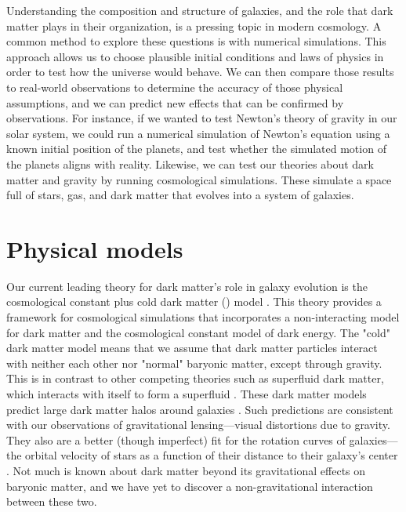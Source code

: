 
Understanding the composition and structure of galaxies, and the role that dark matter plays in their organization, is a pressing topic in modern cosmology. A common method to explore these questions is with numerical simulations. This approach allows us to choose plausible initial conditions and laws of physics in order to test how the universe would behave. We can then compare those results to real-world observations to determine the accuracy of those physical assumptions, and we can predict new effects that can be confirmed by observations. For instance, if we wanted to test Newton's theory of gravity in our solar system, we could run a numerical simulation of Newton's equation using a known initial position of the planets, and test whether the simulated motion of the planets aligns with reality. Likewise, we can test our theories about dark matter and gravity by running cosmological simulations. These simulate a space full of stars, gas, and dark matter that evolves into a system of galaxies.

\section{Physical models}

Our current leading theory for dark matter's role in galaxy evolution is the cosmological constant plus cold dark matter (\lcdm) model \citep{whiteCoreCondensationHeavy1978}. This theory provides a framework for cosmological simulations that incorporates a non-interacting model for dark matter and the cosmological constant model of dark energy. The "cold" dark matter model means that we assume that dark matter particles interact with neither each other nor "normal" baryonic matter, except through gravity. This is in contrast to other competing theories such as superfluid dark matter, which interacts with itself to form a superfluid \citep{delucaSuperfluidDarkMatter2023}. These dark matter models predict large dark matter halos around galaxies \citep{feldmannFIREboxSimulatingGalaxies2022}. Such predictions are consistent with our observations of gravitational lensing---visual distortions due to gravity. They also are a better (though imperfect) fit for the rotation curves of galaxies---the orbital velocity of stars as a function of their distance to their galaxy's center \cite{salesBaryonicSolutionsChallenges2022}. Not much is known about dark matter beyond its gravitational effects on baryonic matter, and we have yet to discover a non-gravitational interaction between these two.

